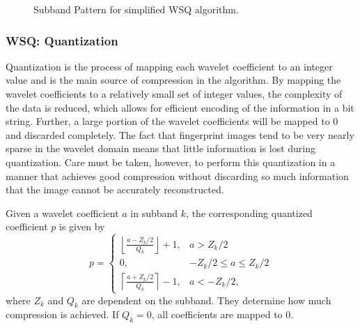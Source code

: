 \begin{figure}[H]
\begin{center}

\caption{Subband Pattern for simplified WSQ algorithm.}
\label{fig:wavelets-subbands}
\end{center}
\end{figure}

\subsubsection*{WSQ: Quantization}
Quantization is the process of mapping each wavelet coefficient to an integer value and is the main source of compression in the algorithm.
By mapping the wavelet coefficients to a relatively small set of integer values, the complexity of the data is reduced, which allows for efficient encoding of the information in a bit string.
Further, a large portion of the wavelet coefficients will be mapped to 0 and discarded completely.
The fact that fingerprint images tend to be very nearly sparse in the wavelet domain means that little information is lost during quantization.
Care must be taken, however, to perform this quantization in a manner that achieves good compression without discarding so much information that the image cannot be accurately reconstructed.

Given a wavelet coefficient $a$ in subband $k$, the corresponding quantized coefficient $p$ is given by
\[
p =
\begin{cases}
   \left\lfloor\frac{a-Z_k/2}{Q_k}\right\rfloor + 1, & a> Z_k/2 \\
   0,       & -Z_k/2 \leq a \leq Z_k/2\\
   \left\lceil\frac{a + Z_k/2}{Q_k}\right\rceil - 1, & a < -Z_k/2,
  \end{cases}
\]
where $Z_k$ and $Q_k$ are dependent on the subband.
They determine how much compression is achieved.
If $Q_k=0$, all coefficients are mapped to 0.

